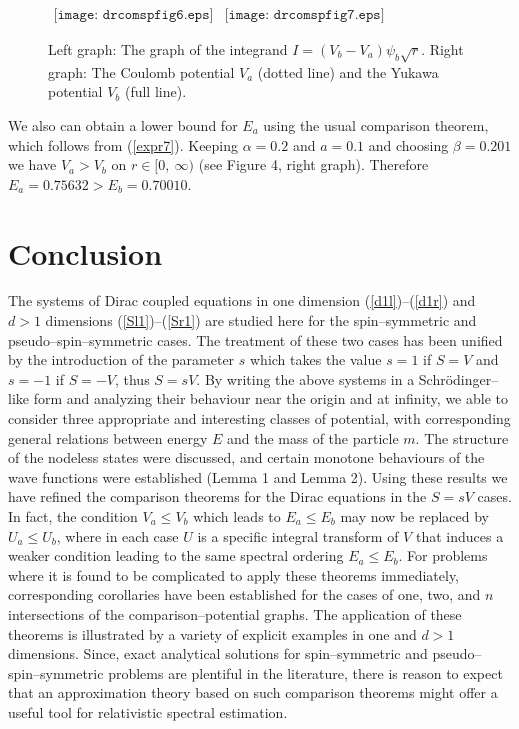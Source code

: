 \documentclass[amsmath,amssymb,superscriptaddress,showkeys, showpacs, aps, nofootinbib]{revtex4}
\begin{document}
\begin{figure}[ht]
\begin{center}$
\begin{array}{cc}
\texttt{[image: drcomspfig6.eps]} & 
\texttt{[image: drcomspfig7.eps]}
\end{array}$
\end{center}
\caption{Left graph: The graph of the integrand $I=(V_b-V_a)\psi_{b}\sqrt{r}$. Right graph: The Coulomb potential $V_a$ (dotted line) and the Yukawa potential $V_b$ (full line).}
\end{figure}
We also can obtain a lower bound for $E_a$ using the usual comparison theorem, which follows from (\ref{expr7}). Keeping $\alpha=0.2$ and $a=0.1$ and choosing $\beta=0.201$ we have $V_a>V_b$ on $r\in[0,\ \infty)$ (see Figure 4, right graph). Therefore $E_a=0.75632>E_b=0.70010$.

\section{Conclusion}
The systems of Dirac coupled equations in one dimension (\ref{d1l})--(\ref{d1r}) and $d>1$ dimensions (\ref{Sl1})--(\ref{Sr1}) are studied here for the spin--symmetric and pseudo--spin--symmetric cases. The treatment of these two cases has been unified by the introduction of the parameter $s$ which takes the value $s=1$ if $S=V$ and $s=-1$ if $S=-V$, thus $S=sV$. By writing the above systems in a Schr\"{o}dinger--like form and analyzing their behaviour near the origin and at infinity, we able to consider three appropriate and interesting classes of potential, with corresponding general relations between energy $E$ and the mass of the particle $m$. The structure of the nodeless states were discussed, and certain monotone behaviours of the wave functions were established (Lemma 1 and Lemma 2). Using these results we have refined the comparison theorems for the Dirac equations in the $S=sV$ cases. In fact, the condition $V_a\le V_b$ which leads to $E_a\le E_b$ may now be replaced by $U_a\le U_b$, where in each case $U$ is a specific integral transform of $V$ that induces a weaker condition leading to the same spectral ordering $E_a\le E_b$.  For problems where it is found to be complicated to apply these theorems immediately, corresponding corollaries have been established for the cases of one, two, and $n$ intersections of the comparison--potential graphs.  The application of these theorems is illustrated by a variety of explicit examples in one and $d>1$ dimensions.  Since, exact analytical solutions  for spin--symmetric and pseudo--spin--symmetric  problems are plentiful in the literature, there is reason to expect that an approximation theory based on such comparison theorems might offer a useful tool for relativistic spectral estimation. 
\end{document}
